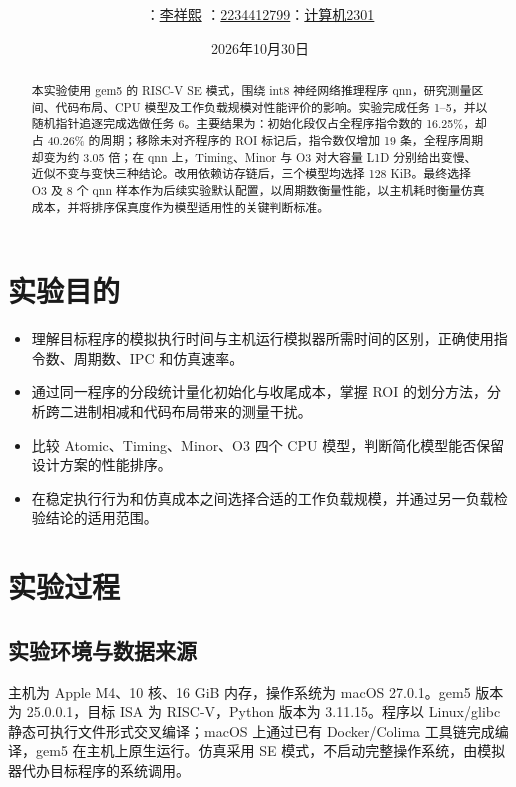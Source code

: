 \documentclass[12pt,a4paper,fontset=mac]{ctexart}
\title{\reporttitle\\[0.4em]\large\subtask}
\author{\small\authname：\underline{李祥熙}\quad
\authid：\underline{2234412799}\quad\class：\underline{计算机2301}}
\date{2026年10月30日}
\begin{document}
\maketitle
\begin{abstract}
本实验使用 gem5 的 RISC-V SE 模式，围绕 int8 神经网络推理程序 qnn，研究测量区间、代码布局、CPU 模型及工作负载规模对性能评价的影响。实验完成任务 1--5，并以随机指针追逐完成选做任务 6。主要结果为：初始化段仅占全程序指令数的 16.25\%，却占 40.26\% 的周期；移除未对齐程序的 ROI 标记后，指令数仅增加 19 条，全程序周期却变为约 3.05 倍；在 qnn 上，Timing、Minor 与 O3 对大容量 L1D 分别给出变慢、近似不变与变快三种结论。改用依赖访存链后，三个模型均选择 128 KiB。最终选择 O3 及 8 个 qnn 样本作为后续实验默认配置，以周期数衡量性能，以主机耗时衡量仿真成本，并将排序保真度作为模型适用性的关键判断标准。
\end{abstract}
\clearpage
\tableofcontents
\newpage

\section{实验目的}
\begin{itemize}
\item 理解目标程序的模拟执行时间与主机运行模拟器所需时间的区别，正确使用指令数、周期数、IPC 和仿真速率。
\item 通过同一程序的分段统计量化初始化与收尾成本，掌握 ROI 的划分方法，分析跨二进制相减和代码布局带来的测量干扰。
\item 比较 Atomic、Timing、Minor、O3 四个 CPU 模型，判断简化模型能否保留设计方案的性能排序。
\item 在稳定执行行为和仿真成本之间选择合适的工作负载规模，并通过另一负载检验结论的适用范围。
\end{itemize}

\section{实验过程}
\subsection{实验环境与数据来源}
主机为 Apple M4、10 核、16 GiB 内存，操作系统为 macOS 27.0.1。gem5 版本为 25.0.0.1，目标 ISA 为 RISC-V，Python 版本为 3.11.15。程序以 Linux/glibc 静态可执行文件形式交叉编译；macOS 上通过已有 Docker/Colima 工具链完成编译，gem5 在主机上原生运行。仿真采用 SE 模式，不启动完整操作系统，由模拟器代办目标程序的系统调用。
\end{document}
